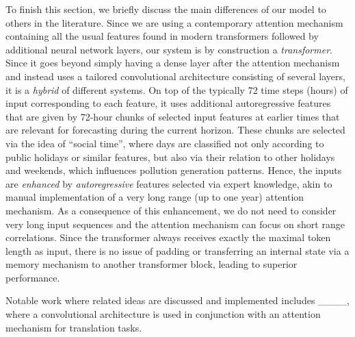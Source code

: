 To finish this section, we briefly discuss the main differences of our model to others in the literature. Since we are using a contemporary attention mechanism containing all the usual features found in modern transformers followed by additional neural network layers, our system is by construction a {\it transformer}. Since it goes beyond simply having a dense layer after the attention mechanism and instead uses a tailored convolutional architecture consisting of several layers, it is a {\it hybrid} of different systems. On top of the typically 72 time steps (hours) of input corresponding to each feature, it uses additional autoregressive features that are given by 72-hour chunks of selected input features at earlier times that are relevant for forecasting during the current horizon. These chunks are selected via the idea of ``social time'', where days are classified not only according to public holidays or similar features, but also via their relation to other holidays and weekends, which influences pollution generation patterns. Hence, the inputs are {\it enhanced} by {\it autoregressive} features selected via expert knowledge, akin to manual implementation of a very long range (up to one year) attention mechanism.  As a consequence of this enhancement, we do not need to consider very long input sequences and the attention mechanism can focus on short range correlations. Since the transformer always receives exactly the maximal token length as input, there is no issue of padding or transferring an internal state via a memory mechanism to another transformer block, leading to superior performance. 

Notable work where related ideas are discussed and implemented includes ____, where a convolutional architecture is used in conjunction with an attention mechanism for translation tasks.